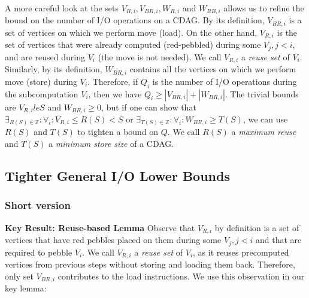 \documentclass[sigplan,review,anonymous]{acmart}\settopmatter{printfolios=true,printccs=false,printacmref=false}
\newcommand{\macb}[1]{\textbf{\textsf{#1}}}
\begin{document}
A more careful look at the sets $V_{R,i}, V_{BR,i}, W_{R,i}$ and $W_{RB,i}$ 
allows us to 
refine the bound on the number of I/O operations on a CDAG. By its definition,  
$V_{BR,i}$ is a set of vertices on which we perform move  (load).  
On the other hand, $V_{R,i}$ is the set of vertices that were already computed 
(red-pebbled) during some $V_j, j < i$, and are reused during $V_i$ (the move 
 is not needed).  
We call $V_{R,i}$ a \emph{reuse set} of $V_i$. Similarly, by its definition, 
$W_{BR,i}$ contains all the vertices on which we perform move  
(store)  during $V_i$.
Therefore, if $Q_i$ is the number of I/O 
operations during the subcomputation $V_i$, then we have $ Q_i \ge |V_{BR,i}| 
+  |W_{BR,i}|$.
The trivial bounds are 
$V_{R,i} le S$ and $W_{BR,i} \ge 0$, but if one can show that $\exists_{R(S) 
\in \mathbb{Z}}: 
\forall_i: V_{R,i} \le R(S) < S$ or $\exists_{T(S) \in \mathbb{Z}}: 
\forall_i: W_{BR,i} \ge T(S)$, we can use $R(S)$ and $T(S)$ to tighten a bound 
on 
$Q$. We call $R(S)$ a \emph{maximum reuse} and $T(S)$ a \emph{minimum store 
size} of 
a CDAG.


\subsection{Tighter General I/O Lower Bounds}
\label{sec:seq-proof}

\subsubsection{Short version}

\macb{Key Result: Reuse-based Lemma}
Observe that $V_{R,i}$ by definition is a set of vertices that have red pebbles 
placed on them during some $V_j, j < i$ and that are required to pebble $V_i$. 
We call $V_{R,i}$ a \emph{reuse set} of $V_i$, as it reuses 
precomputed vertices from previous steps without storing and loading them 
back. Therefore, only set $V_{BR,i}$ contributes to the load instructions. We 
use this observation in our key lemma:
\end{document}
